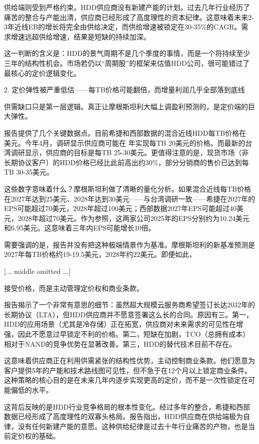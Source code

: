 \documentclass[11pt]{ctexart}
\begin{document}
供给端则受到严格约束。HDD供应商没有新建产能的计划。过去几年行业经历了痛苦的整合与产能出清，供应商已经形成了高度理性的资本纪律。这意味着未来2-3年近线EB的增长将完全由供给决定，而供给增速被锁定在30-35\%的CAGR。需求增速远超供给增速，结果是短缺的持续加深。

这一判断的含义是：HDD的景气周期不是几个季度的事情，而是一个将持续至少三年的结构性机会。市场若仍以“周期股”的框架来估值HDD公司，很可能错过了最核心的定价逻辑变化。

2. 定价弹性被严重低估——每TB价格可能翻倍，而增量利润几乎全部落到底线

供需缺口只是第一层逻辑。真正让摩根斯坦利大幅上调盈利预测的，是定价端的巨大弹性。

报告提供了几个关键数据点。目前希捷和西部数据的混合近线HDD每TB价格在 美元。今年4月，调研显示供应商可能在 年实现每TB 20美元的价格。而最新的台湾调研显示，供应商的目标是每TB 25-30美元。更值得注意的是，现货市场（非长期协议客户）的HDD价格已经比此前高出约30\%，部分分销商的售价已达到每TB 30-35美元。

这些数字意味着什么？摩根斯坦利做了清晰的量化分析。如果混合近线每TB价格在2027年达到25美元、2028年达到30美元——与台湾调研一致——希捷在2027年的EPS可能超过70美元，2028年超过100美元；西部数据2027年EPS可能超过40美元，2028年超过70美元。作为参照，这两家公司2025年的EPS分别约为10.24美元和6.95美元。这意味着三年内EPS可能增长10倍。

需要强调的是，报告并没有把这种极端情景作为基准。摩根斯坦利的新基准预测是2027年每TB价格约19-19.5美元，2028年约22美元。即便如此，

[... middle omitted ...]

接受价格，而是主动管理定价权和商业条款。

报告揭示了一个非常有意思的细节：虽然超大规模云服务商希望签订长达2032年的长期协议（LTA），但HDD供应商并不愿意签署这么长的合同。原因有三。第一，HDD的应用场景（尤其是冷存储）正在拓宽，供应商对未来需求的可见性在增强，因此不愿意过早锁定不利的价格。第二，短缺在加剧，TCO（总拥有成本）相对于NAND的竞争优势在显著改善。第三，HDD的替代技术目前不存在。

这意味着供应商正在利用供需紧张的结构性优势，主动控制商业条款。他们愿意为客户提供5年的产能和技术路线图可见性，但不急于在12个月以上锁定商业条件。这种策略的核心目的是在未来几年内逐步实现更高的定价，而不是一次性锁定在可能偏低的水平。

这背后反映的是HDD行业竞争格局的根本性变化。经过多年的整合，希捷和西部数据已经形成了高度理性的双寡头格局。报告指出，HDD供应商在供给端极为自律，没有任何新建产能的意愿。这种供给纪律是过去十年行业痛苦的产物，也是当前定价权的基础。
\end{document}
